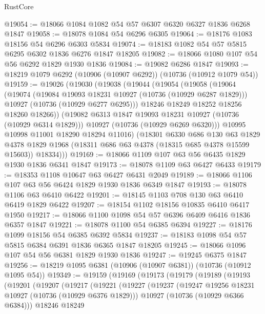 \begin{lexlean}{RustCore}
\begin{coremodule}
@19054 := @18066 @1084 @1082 @54 @57 @6307 @6320 @6327 @1836 @6268 @1847
@19058 := @18078 @1084 @54 @6296 @6305
@19064 := @18176 @1083 @18156 @54 @6296 @6303 @5834
@19074 := @18183 @1082 @54 @57 @5815 @6295 @6302 @1836 @6276 @1847 @18205
@19082 := @18066 @1080 @107 @54 @56 @6292 @1829 @1930 @1836
@19084 := @19082 @6286 @1847
@19093 := @18219 @1079 @6292 (@10906 (@10907 @6292)) (@10736 (@10912 @1079 @54))
@19159 := @19026
    (@19030
      (@19038
        (@19044
          (@19054
            (@19058
              (@19064
                (@19074
                  (@19084 @19093 @18231 @10927 (@10736 (@10929 @6287 @1829)))
                  @10927
                  (@10736 (@10929 @6277 @6295)))
                @18246
                @18249
                @18252
                @18256
                @18260
                @18266))
            (@19082 @6313 @1847 @19093 @18231 @10927 (@10736 (@10929 @6314 @1829)))
            @10927
            (@10736 (@10929 @6269 @6320)))
          @10995
          @10998
          @11001
          @18290
          @18294
          @11016)
        (@18301
          @6330
          @686
          @130
          @63
          @1829
          @4378
          @1829
          @1968
          (@18311 @686 @63 @4378 (@18315 @685 @4378 @15599 @15603))
          @18334)))
@19169 := @18066 @1109 @107 @63 @56 @6435 @1829 @1930 @1836 @6341 @1847
@19173 := @18078 @1109 @63 @6427 @6433
@19179 := @18353 @1108 @10647 @63 @6427 @6431 @2049
@19189 := @18066 @1106 @107 @63 @56 @6424 @1829 @1930 @1836 @6349 @1847
@19193 := @18078 @1106 @63 @6410 @6422
@19201 := @18145 @1103 @708 @130 @63 @6410 @6419 @1829 @6422
@19207 := @18154 @1102 @18156 @10835 @6410 @6417 @1950
@19217 := @18066 @1100 @1098 @54 @57 @6396 @6409 @6416 @1836 @6357 @1847
@19221 := @18078 @1100 @54 @6385 @6394
@19227 := @18176 @1099 @18156 @54 @6385 @6392 @5834
@19237 := @18183 @1098 @54 @57 @5815 @6384 @6391 @1836 @6365 @1847 @18205
@19245 := @18066 @1096 @107 @54 @56 @6381 @1829 @1930 @1836
@19247 := @19245 @6375 @1847
@19256 := @18219 @1095 @6381 (@10906 (@10907 @6381)) (@10736 (@10912 @1095 @54))
@19349 := @19159
    (@19169
      (@19173
        (@19179
          (@19189
            (@19193
              (@19201
                (@19207
                  (@19217
                    (@19221
                      (@19227
                        (@19237
                          (@19247 @19256 @18231 @10927 (@10736 (@10929 @6376 @1829)))
                          @10927
                          (@10736 (@10929 @6366 @6384)))
                        @18246
                        @18249

\end{coremodule}
\end{lexlean}
